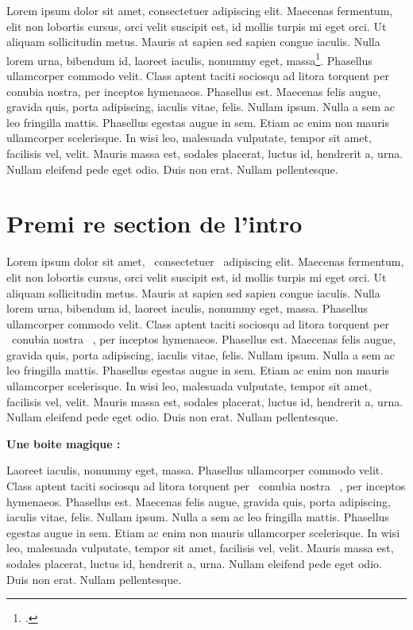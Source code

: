 \documentclass{article}
\begin{document}
Lorem ipsum dolor sit amet, consectetuer adipiscing elit. Maecenas fermentum, elit non lobortis cursus, orci velit suscipit est, id mollis turpis mi eget orci. Ut aliquam sollicitudin metus. Mauris at sapien sed sapien congue iaculis. Nulla lorem urna, bibendum id, laoreet iaculis, nonummy eget, massa\footcite[32]{Pierre1901}. Phasellus ullamcorper commodo velit. Class aptent taciti sociosqu ad litora torquent per conubia nostra, per inceptos hymenaeos. Phasellus est. Maecenas felis augue, gravida quis, porta adipiscing, iaculis vitae, felis. Nullam ipsum. Nulla a sem ac leo fringilla mattis. Phasellus egestas augue in sem. Etiam ac enim non mauris ullamcorper scelerisque. In wisi leo, malesuada vulputate, tempor sit amet, facilisis vel, velit. Mauris massa est, sodales placerat, luctus id, hendrerit a, urna. Nullam eleifend pede eget odio. Duis non erat. Nullam pellentesque. 

\section*{Premi re section de l'intro}

Lorem ipsum dolor sit amet,  ~consectetuer~  adipiscing elit. Maecenas fermentum, elit non lobortis cursus, orci velit suscipit est, id mollis turpis mi eget orci. Ut aliquam sollicitudin metus. Mauris at sapien sed sapien congue iaculis. Nulla lorem urna, bibendum id, laoreet iaculis, nonummy eget, massa. Phasellus ullamcorper commodo velit. Class aptent taciti sociosqu ad litora torquent per  ~conubia nostra~ , per inceptos hymenaeos. Phasellus est. Maecenas felis augue, gravida quis, porta adipiscing, iaculis vitae, felis. Nullam ipsum. Nulla a sem ac leo fringilla mattis. Phasellus egestas augue in sem. Etiam ac enim non mauris ullamcorper scelerisque. In wisi leo, malesuada vulputate, tempor sit amet, facilisis vel, velit. Mauris massa est, sodales placerat, luctus id, hendrerit a, urna. Nullam eleifend pede eget odio. Duis non erat. Nullam pellentesque.

\textbf{Une boite magique : }


Laoreet iaculis, nonummy eget, massa. Phasellus ullamcorper commodo velit. Class aptent taciti sociosqu ad litora torquent per  ~conubia nostra~ , per inceptos hymenaeos. Phasellus est. Maecenas felis augue, gravida quis, porta adipiscing, iaculis vitae, felis. Nullam ipsum. Nulla a sem ac leo fringilla mattis. Phasellus egestas augue in sem. Etiam ac enim non mauris ullamcorper scelerisque. In wisi leo, malesuada vulputate, tempor sit amet, facilisis vel, velit. Mauris massa est, sodales placerat, luctus id, hendrerit a, urna. Nullam eleifend pede eget odio. Duis non erat. Nullam pellentesque.
\end{document}
